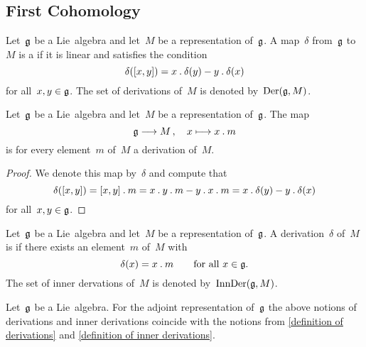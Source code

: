 \subsection{First Cohomology}

\begin{definition}
	Let~$\mathfrak{g}$ be a Lie~algebra and let~$M$ be a representation of~$\mathfrak{g}$.
	A map~$\delta$ from~$\mathfrak{g}$ to~$M$ is a  if it is linear and satisfies the condition
	\[
		\delta( [x,y] )
		=
		x \mathbin{.} \delta(y) - y \mathbin{.} \delta(x)
	\]
	for all~$x, y \in \mathfrak{g}$.
	The set of derivations of~$M$ is denoted by~$\operatorname{Der}(\mathfrak{g}, M)$.
\end{definition}




\begin{proposition}
	\label{inner derivations of representations}
	Let~$\mathfrak{g}$ be a Lie~algebra and let~$M$ be a representation of~$\mathfrak{g}$.
	The map
	\[
		\glie
		\to
		M \,,
		\quad
		x
		\mapsto
		x \act m
	\]
	is for every element~$m$ of~$M$ a derivation of~$M$.
\end{proposition}


\begin{proof}
	We denote this map by~$\delta$ and compute that
	\[
		\delta([x,y])
		=
		[x,y] \mathbin{.} m
		=
		x \mathbin{.} y \mathbin{.} m - y \mathbin{.} x \mathbin{.} m
		=
		x \mathbin{.} \delta(y) - y \mathbin{.} \delta(x)
	\]
	for all~$x, y \in \mathfrak{g}$.
\end{proof}


\begin{definition}
	Let~$\mathfrak{g}$ be a Lie~algebra and let~$M$ be a representation of~$\mathfrak{g}$.
	A derivation~$\delta$ of~$M$ is  if there exists an element~$m$ of~$M$ with
	\[
		\delta(x) = x \mathbin{.} m
		\qquad
		\text{for all~$x \in \mathfrak{g}$.}
	\]
	The set of inner dervations of~$M$ is denoted by~$\operatorname{InnDer}(\mathfrak{g}, M)$.
\end{definition}


\begin{remark}
	Let~$\mathfrak{g}$ be a Lie~algebra.
	For the adjoint representation of~$\mathfrak{g}$ the above notions of derivations and inner derivations coincide with the notions from \cref{definition of derivations} and \cref{definition of inner derivations}.
\end{remark}


